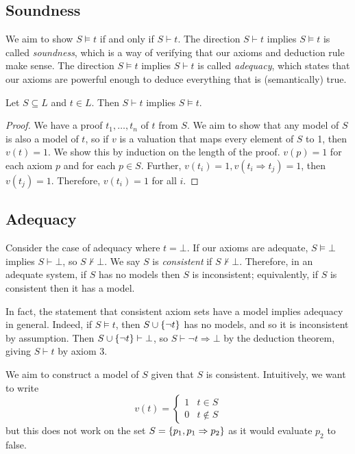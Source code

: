 \subsection{Soundness}
We aim to show \( S \models t \) if and only if \( S \vdash t \).
The direction \( S \vdash t \) implies \( S \models t \) is called \emph{soundness}, which is a way of verifying that our axioms and deduction rule make sense.
The direction \( S \models t \) implies \( S \vdash t \) is called \emph{adequacy}, which states that our axioms are powerful enough to deduce everything that is (semantically) true.
\begin{proposition}
    Let \( S \subseteq L \) and \( t \in L \).
    Then \( S \vdash t \) implies \( S \models t \).
\end{proposition}
\begin{proof}
    We have a proof \( t_1, \dots, t_n \) of \( t \) from \( S \).
    We aim to show that any model of \( S \) is also a model of \( t \), so if \( v \) is a valuation that maps every element of \( S \) to 1, then \( v(t) = 1 \).
    We show this by induction on the length of the proof.
    \( v(p) = 1 \) for each axiom \( p \) and for each \( p \in S \).
    Further, \( v(t_i) = 1, v(t_i \Rightarrow t_j) = 1 \), then \( v(t_j) = 1 \).
    Therefore, \( v(t_i) = 1 \) for all \( i \).
\end{proof}

\subsection{Adequacy}
Consider the case of adequacy where \( t = \bot \).
If our axioms are adequate, \( S \models \bot \) implies \( S \vdash \bot \), so \( S \not\vdash \bot \).
We say \( S \) is \emph{consistent} if \( S \not\vdash \bot \).
Therefore, in an adequate system, if \( S \) has no models then \( S \) is inconsistent; equivalently, if \( S \) is consistent then it has a model.

In fact, the statement that consistent axiom sets have a model implies adequacy in general.
Indeed, if \( S \models t \), then \( S \cup \qty{\neg t} \) has no models, and so it is inconsistent by assumption.
Then \( S \cup \qty{\neg t} \vdash \bot \), so \( S \vdash \neg t \Rightarrow \bot \) by the deduction theorem, giving \( S \vdash t \) by axiom 3.

We aim to construct a model of \( S \) given that \( S \) is consistent.
Intuitively, we want to write
\[ v(t) = \begin{cases}
    1 & t \in S \\
    0 & t \not\in S
\end{cases} \]
but this does not work on the set \( S = \qty{p_1, p_1 \Rightarrow p_2} \) as it would evaluate \( p_2 \) to false.

